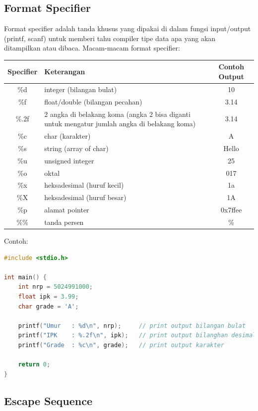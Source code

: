 \subsection{Format Specifier}
Format specifier adalah tanda khusus yang dipakai di dalam fungsi input/output (printf, scanf) untuk memberi tahu compiler tipe data apa yang akan ditampilkan atau dibaca.
Macam-macam format specifier:
\begin{center}
	\begin{tabular}{|c|p{7cm}|c|}
		\hline
		\textbf{Specifier} & \textbf{Keterangan} & \textbf{Contoh Output} \\ \hline
		\%d   & integer (bilangan bulat) & 10 \\ \hline
		\%f   & float/double (bilangan pecahan) & 3.14 \\ \hline
		\%.2f  & 2 angka di belakang koma (angka 2 bisa diganti untuk mengatur jumlah angka di belakang koma) & 3.14 \\ \hline
		\%c   & char (karakter) & A \\ \hline
		\%s   & string (array of char) & Hello \\ \hline
		\%u   & unsigned integer & 25 \\ \hline
		\%o   & oktal & 017 \\ \hline
		\%x   & heksadesimal (huruf kecil) & 1a \\ \hline
		\%X   & heksadesimal (huruf besar) & 1A \\ \hline
		\%p   & alamat pointer & 0x7ffee \\ \hline
		\%\%  & tanda persen & \% \\ \hline
	\end{tabular}
\end{center}
Contoh:
\begin{lstlisting}[language=c]
#include <stdio.h>

int main() {
	int nrp = 5024991000;
	float ipk = 3.99;
	char grade = 'A';

	printf("Umur   : %d\n", nrp);	  // print output bilangan bulat
	printf("IPK    : %.2f\n", ipk);   // print output bilanghan desimal dengan 2 angka di belakang koma
	printf("Grade  : %c\n", grade);	  // print output karakter

	return 0;
}
\end{lstlisting}

\subsection{Escape Sequence}

